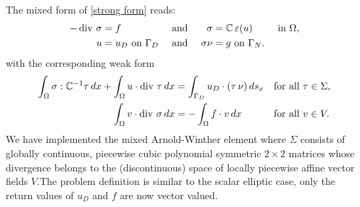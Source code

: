The mixed form of \eqref{strong form} reads:
\begin{align}\label{elasticity mixed strong form}
-\operatorname{div}\, \sigma&=f&  &\text{ and }& \sigma&=\mathbb{C}\,\varepsilon(u)&\text{  in }\Omega,\\
u&=u_D\text{ on }\Gamma_D& &\text{ and }& \sigma \nu&=g \text{ on
}\Gamma_N.
\end{align}
with the corresponding weak form
\begin{align*}
\int_{\Omega} \sigma:\mathbb{C}^{-1}\tau \, dx + \int_{\Omega} u\cdot\operatorname{div}\,
\tau \,dx
&= \int_{\Gamma_D} u_D\cdot (\tau \,\nu) \, ds_x &&\text{for all } \tau \in \Sigma,\\
\int_{\Omega} v\cdot\operatorname{div}\, \sigma\,dx &= - \int_{\Omega} f \cdot v
\, dx &&\text{for all } v \in V.
\end{align*}
We have implemented the mixed Arnold-Winther element where $\Sigma$
consists of globally continuous, piecewise cubic polynomial
symmetric $2\times 2$ matrices whose divergence belongs to the
(discontinuous) space of locally piecewise affine vector fields
$V$.\medskip The problem definition is similar to the scalar
elliptic case, only the return values of $u_D$ and $f$ are now
vector valued.
